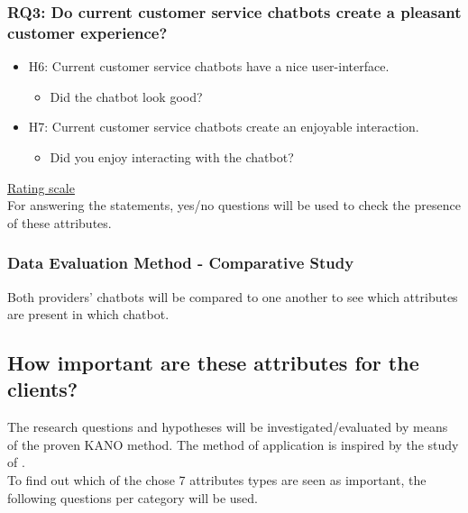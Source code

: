 \subsubsection{RQ3: Do current customer service chatbots create a pleasant customer experience?}
\begin{itemize}
	\item H6: Current customer service chatbots have a nice user-interface.
	\begin{itemize}
		\item Did the chatbot look good?
	\end{itemize}
	\item H7: Current customer service chatbots create an enjoyable interaction.
	\begin{itemize}
		\item Did you enjoy interacting with the chatbot?
	\end{itemize}
\end{itemize}
\ul{Rating scale}\\
For answering the statements, yes/no questions will be used to check the presence of these attributes.\\

\subsubsection{Data Evaluation Method - Comparative Study}
Both providers’ chatbots will be compared to one another to see which attributes are present in which chatbot.\\

\subsection{How important are these attributes for the clients?}
The research questions and hypotheses will be investigated/evaluated by means of the proven KANO method. The method of application is inspired by the study of \cite{Verkeyn2018}.\\
\break
To find out which of the chose 7 attributes types are seen as important, the following questions per category will be used.

